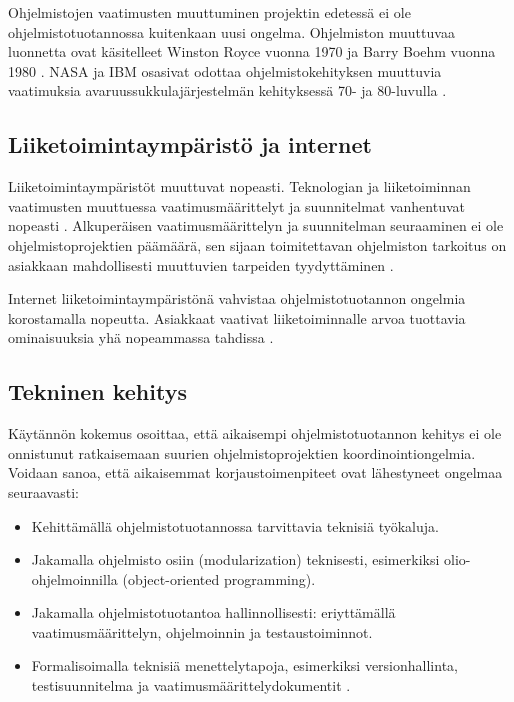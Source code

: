 \documentclass[finnish]{tktltiki2}
\theoremstyle{definition}
\theoremstyle{remark}
\begin{document}
Ohjelmistojen vaatimusten muuttuminen projektin edetessä ei ole ohjelmistotuotannossa kuitenkaan uusi ongelma. Ohjelmiston muuttuvaa luonnetta ovat käsitelleet Winston Royce vuonna 1970 \cite{ROY70} ja Barry Boehm vuonna 1980 \cite{BOE88}. NASA ja IBM osasivat odottaa ohjelmistokehityksen muuttuvia vaatimuksia avaruussukkulajärjestelmän kehityksessä 70- ja 80-luvulla \cite{MWR84}.

\subsection{Liiketoimintaympäristö ja internet}

Liiketoimintaympäristöt muuttuvat nopeasti. Teknologian ja liiketoiminnan vaatimusten muuttuessa vaatimusmäärittelyt ja suunnitelmat vanhentuvat nopeasti \cite{WIC03}. Alkuperäisen vaatimusmäärittelyn ja suunnitelman seuraaminen ei ole ohjelmistoprojektien päämäärä, sen sijaan toimitettavan ohjelmiston tarkoitus on asiakkaan mahdollisesti muuttuvien tarpeiden tyydyttäminen \cite{HIC01}.

Internet liiketoimintaympäristönä vahvistaa ohjelmistotuotannon ongelmia korostamalla nopeutta. Asiakkaat vaativat liiketoiminnalle arvoa tuottavia ominaisuuksia yhä nopeammassa tahdissa \cite{BRL03}.

\subsection{Tekninen kehitys}

Käytännön kokemus osoittaa, että aikaisempi ohjelmistotuotannon kehitys ei ole onnistunut ratkaisemaan suurien ohjelmistoprojektien koordinointiongelmia. 
Voidaan sanoa, että aikaisemmat korjaustoimenpiteet ovat lähestyneet ongelmaa seuraavasti: 
\begin{itemize}
 \item Kehittämällä ohjelmistotuotannossa tarvittavia teknisiä työkaluja.
 \item Jakamalla ohjelmisto osiin (modularization) teknisesti, esimerkiksi olio-ohjelmoinnilla (object-oriented programming). 
 \item Jakamalla ohjelmistotuotantoa hallinnollisesti: eriyttämällä vaatimusmäärittelyn, ohjelmoinnin ja testaustoiminnot.
 \item Formalisoimalla teknisiä menettelytapoja, esimerkiksi versionhallinta, testisuunnitelma ja vaatimusmäärittelydokumentit \cite{KES95}.
\end{itemize}
\end{document}
